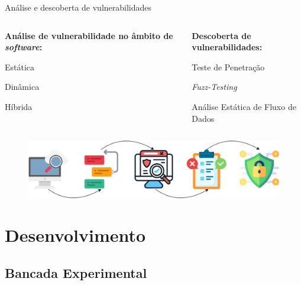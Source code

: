 \documentclass{uspBeamer}
\begin{document}
    \begin{frame}{Análise e descoberta de vulnerabilidades}
        \begin{columns}
            \begin{column}{.5\textwidth}
                \textbf{Análise de vulnerabilidade no âmbito de \textit{software}:}
                \begin{wideitemize}
                    \item Estática
                    \item Dinâmica
                    \item Híbrida
                \end{wideitemize}
            \end{column}
            \begin{column}{.5\textwidth}
                \textbf{Descoberta de vulnerabilidades:}
                \begin{wideitemize}
                    \item Teste de Penetração
                    \item \textit{Fuzz-Testing}
                    \item Análise Estática de Fluxo de Dados
                \end{wideitemize}
            \end{column}
        \end{columns}
        \begin{figure}
            \includegraphics[width=.8\textwidth]{vulAnalysis.png}
        \end{figure}
    \end{frame}

    \section{Desenvolvimento}
    \subsection{Bancada Experimental}
\end{document}

